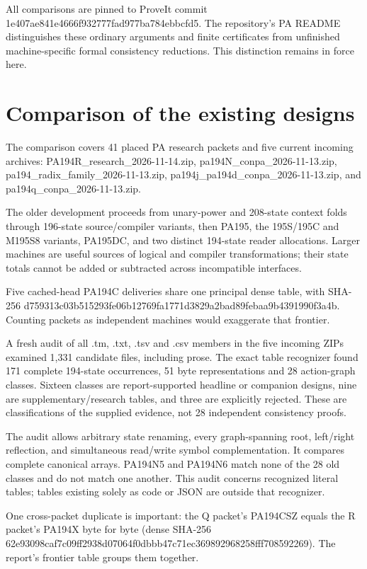 \documentclass[11pt,letterpaper]{article}
\begin{document}
All comparisons are pinned to ProveIt commit 1e407ae841e4666f932777fad977ba784ebbcfd5. The repository's PA README distinguishes these ordinary arguments and finite certificates from unfinished machine-specific formal consistency reductions. This distinction remains in force here.

\section{Comparison of the existing designs}
The comparison covers 41 placed PA research packets and five current incoming archives: PA194R\_research\_2026-11-14.zip, pa194N\_conpa\_2026-11-13.zip, pa194\_radix\_family\_2026-11-13.zip, pa194j\_pa194d\_conpa\_2026-11-13.zip, and pa194q\_conpa\_2026-11-13.zip.

The older development proceeds from unary-power and 208-state context folds through 196-state source/compiler variants, then PA195, the 195S/195C and M195S8 variants, PA195DC, and two distinct 194-state reader allocations. Larger machines are useful sources of logical and compiler transformations; their state totals cannot be added or subtracted across incompatible interfaces.

Five cached-head PA194C deliveries share one principal dense table, with SHA-256 d759313c03b515293fe06b12769fa1771d3829a2bad89febaa9b4391990f3a4b. Counting packets as independent machines would exaggerate that frontier.

A fresh audit of all .tm, .txt, .tsv and .csv members in the five incoming ZIPs examined 1,331 candidate files, including prose. The exact table recognizer found 171 complete 194-state occurrences, 51 byte representations and 28 action-graph classes. Sixteen classes are report-supported headline or companion designs, nine are supplementary/research tables, and three are explicitly rejected. These are classifications of the supplied evidence, not 28 independent consistency proofs.

The audit allows arbitrary state renaming, every graph-spanning root, left/right reflection, and simultaneous read/write symbol complementation. It compares complete canonical arrays. PA194N5 and PA194N6 match none of the 28 old classes and do not match one another. This audit concerns recognized literal tables; tables existing solely as code or JSON are outside that recognizer.

One cross-packet duplicate is important: the Q packet's PA194CSZ equals the R packet's PA194X byte for byte (dense SHA-256 62e93098caf7c09ff2938d07064f0dbbb47c71ec369892968258fff708592269). The report's frontier table groups them together.
\end{document}
